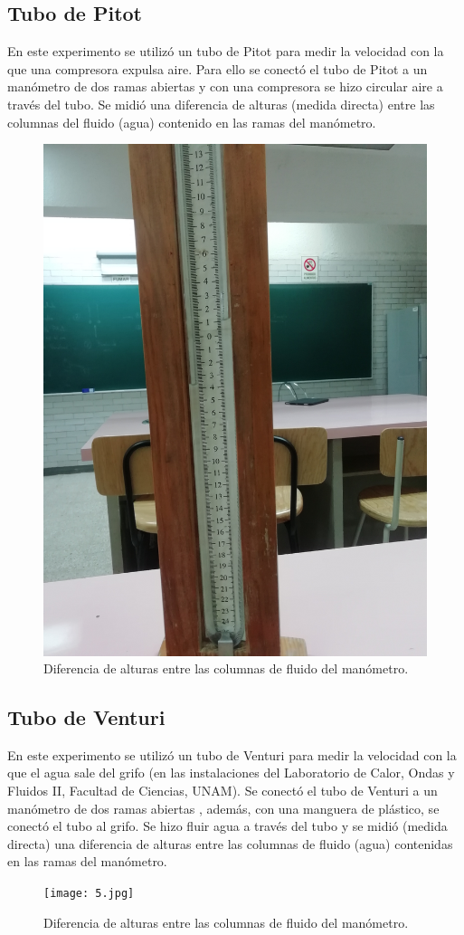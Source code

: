 \documentclass[10pt,a4paper]{article}
\begin{document}
\subsection*{Tubo de Pitot}
En este experimento se utilizó un tubo de Pitot para medir la velocidad con la que una compresora expulsa aire. 
Para ello se conectó el tubo de Pitot a un manómetro de dos ramas abiertas y con una compresora se hizo circular aire a través del tubo. 
Se midió una diferencia de alturas (medida directa) entre las columnas del fluido (agua) contenido en las ramas del manómetro.
\begin{figure}[H]
\includegraphics[scale=0.05]{4.jpg}
\centering
\caption{Diferencia de alturas entre las columnas de fluido del manómetro.}
\end{figure}

\subsection*{Tubo de Venturi}
En este experimento se utilizó un tubo de Venturi para medir la velocidad con la que el agua sale del grifo (en las instalaciones del Laboratorio de Calor, Ondas y Fluidos II, Facultad de Ciencias, UNAM).
Se conectó el tubo de Venturi a un manómetro de dos ramas abiertas , además, con una manguera de plástico, se conectó el tubo al grifo. Se hizo fluir agua a través del tubo y se midió (medida directa) una diferencia de alturas entre las columnas de fluido (agua) contenidas en las ramas del manómetro. 
\begin{figure}[H]
\texttt{[image: 5.jpg]}
\centering
\caption{Diferencia de alturas entre las columnas de fluido del manómetro.}
\end{figure}
\end{document}
